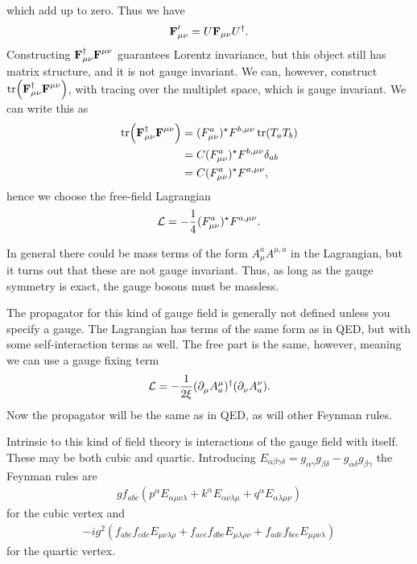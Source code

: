 which add up to zero. Thus we have
\begin{align*}
	\textbf{F}_{\mu\nu}^{\prime} = U\textbf{F}_{\mu\nu}U^{\dagger}.
\end{align*}
Constructing $\textbf{F}_{\mu\nu}^{\dagger}\textbf{F}^{\mu\nu}$ guarantees Lorentz invariance, but this object still has matrix structure, and it is not gauge invariant. We can, however, construct $\tr(\textbf{F}_{\mu\nu}^{\dagger}\textbf{F}^{\mu\nu})$, with tracing over the multiplet space, which is gauge invariant. We can write this as
\begin{align*}
	\tr(\textbf{F}_{\mu\nu}^{\dagger}\textbf{F}^{\mu\nu}) &= (F_{\mu\nu}^{a})^{\star} F^{b, \mu\nu}\tr(T_{a}T_{b}) \\
	                                            &= C(F_{\mu\nu}^{a})^{\star} F^{b, \mu\nu}\delta_{ab} \\
	                                            &= C(F_{\mu\nu}^{a})^{\star} F^{a, \mu\nu},
\end{align*}
hence we choose the free-field Lagrangian
\begin{align*}
	\mathcal{L} = -\frac{1}{4}(F_{\mu\nu}^{a})^{\star} F^{a, \mu\nu}.
\end{align*}

In general there could be mass terms of the form $A_{\mu}^{a}A^{\mu, a}$ in the Lagrangian, but it turns out that these are not gauge invariant. Thus, as long as the gauge symmetry is exact, the gauge bosons must be massless.

The propagator for this kind of gauge field is generally not defined unless you specify a gauge. The Lagrangian has terms of the same form as in QED, but with some self-interaction terms as well. The free part is the same, however, meaning we can use a gauge fixing term
\begin{align*}
	\mathcal{L} = -\frac{1}{2\xi}(\partial^{}_{\mu}A^{\mu}_{a})^{\dagger} (\partial^{}_{\nu}A^{\nu}_{a}).
\end{align*}
Now the propagator will be the same as in QED, as will other Feynman rules.

Intrinsic to this kind of field theory is interactions of the gauge field with itself. These may be both cubic and quartic. Introducing $E_{\alpha\beta\gamma\delta} = g_{\alpha\gamma}g_{\beta\delta} - g_{\alpha\delta}g_{\beta\gamma}$ the Feynman rules are
\begin{align*}
	gf_{ab\overline{c}}\left(p^{\alpha}E_{\alpha\mu\nu\lambda} + k^{\alpha}E_{\alpha\nu\lambda\mu} + q^{\alpha}E_{\alpha\lambda\mu\nu}\right)
\end{align*}
for the cubic vertex and
\begin{align*}
	-ig^{2}\left(f_{ab\overline{e}}f_{cde}E_{\mu\nu\lambda\rho} + f_{ac\overline{e}}f_{dbe}E_{\mu\lambda\rho\nu} + f_{ad\overline{e}}f_{bce}E_{\mu\rho\nu\lambda}\right)
\end{align*}
for the quartic vertex.

